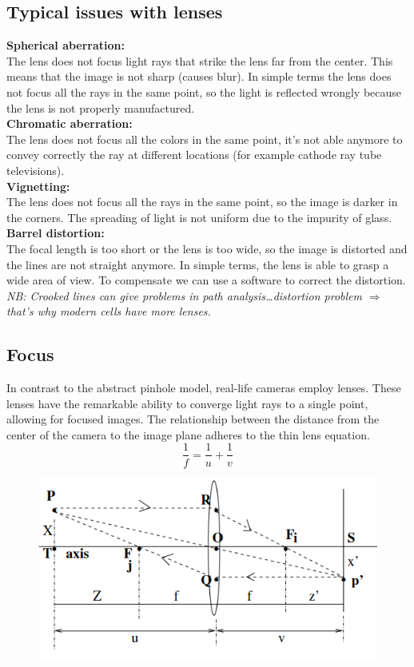 \subsection{Typical issues with lenses}
\textbf{Spherical aberration:} 
\\The lens does not focus light rays that strike the lens far from the center. This means that the image is not sharp (causes blur).
In simple terms the lens does not focus all the rays in the same point, so the light is reflected wrongly because the lens is not properly manufactured.
\\\textbf{Chromatic aberration:}
\\The lens does not focus all the colors in the same point, it's not able anymore to convey correctly the ray at different locations (for example cathode ray tube televisions).
\\\textbf{Vignetting:}
\\The lens does not focus all the rays in the same point, so the image is darker in the corners. The spreading of light is not uniform due to the impurity of glass.
\\\textbf{Barrel distortion:}
\\The focal length is too short or the lens is too wide, so the image is distorted and the lines are not straight anymore.
In simple terms, the lens is able to grasp a wide area of view. To compensate we can use a software to correct the distortion. 
\\\textit{NB: Crooked lines can give problems in path analysis\dots distortion problem $\Rightarrow$ that's why modern cells have more lenses.}
\subsection{Focus}
In contrast to the abstract pinhole model, real-life cameras employ lenses. These lenses have the remarkable ability to converge light rays to a single point, allowing for focused images. 
The relationship between the distance from the center of the camera to the image plane adheres to the thin lens equation.
\[
    \frac{1}{f} = \frac{1}{u} + \frac{1}{v}
\]
\begin{figure}
    \includegraphics[scale=0.4]{Figures/ThinLenses.png}
\end{figure}


